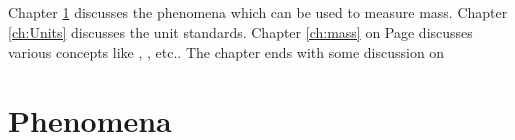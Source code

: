 \documentclass{book}
\begin{document}
    \paragraph{}
    Chapter \ref{ch:Phenomena} discusses the phenomena which can be used to measure mass. Chapter \ref{ch:Units} discusses the unit standards. Chapter \ref{ch:mass} on Page \pageref{ch:mass} discusses various concepts like , , etc.. The chapter ends with some discussion on 
    
    \tableofcontents
    \listoftables
    \listoffigures

    \chapter{Phenomena}
    \label{ch:Phenomena}
    \setcounter{page}{1}
    
\end{document}
